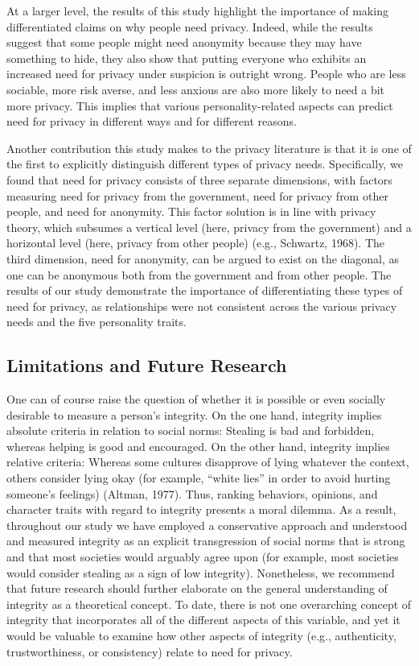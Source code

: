 \documentclass[man,floatsintext]{apa6}
\begin{document}
At a larger level, the results of this study highlight the importance of making differentiated claims on why people need privacy. Indeed, while the results suggest that some people might need anonymity because they may have something to hide, they also show that putting everyone who exhibits an increased need for privacy under suspicion is outright wrong. People who are less sociable, more risk averse, and less anxious are also more likely to need a bit more privacy. This implies that various personality-related aspects can predict need for privacy in different ways and for different reasons.

Another contribution this study makes to the privacy literature is that it is one of the first to explicitly distinguish different types of privacy needs. Specifically, we found that need for privacy consists of three separate dimensions, with factors measuring need for privacy from the government, need for privacy from other people, and need for anonymity. This factor solution is in line with privacy theory, which subsumes a vertical level (here, privacy from the government) and a horizontal level (here, privacy from other people) (e.g., Schwartz, 1968). The third dimension, need for anonymity, can be argued to exist on the diagonal, as one can be anonymous both from the government and from other people. The results of our study demonstrate the importance of differentiating these types of need for privacy, as relationships were not consistent across the various privacy needs and the five personality traits.

\hypertarget{limitations-and-future-research}{%
\subsection{Limitations and Future Research}\label{limitations-and-future-research}}

One can of course raise the question of whether it is possible or even socially desirable to measure a person's integrity. On the one hand, integrity implies absolute criteria in relation to social norms: Stealing is bad and forbidden, whereas helping is good and encouraged. On the other hand, integrity implies relative criteria: Whereas some cultures disapprove of lying whatever the context, others consider lying okay (for example, \enquote{white lies} in order to avoid hurting someone's feelings) (Altman, 1977). Thus, ranking behaviors, opinions, and character traits with regard to integrity presents a moral dilemma. As a result, throughout our study we have employed a conservative approach and understood and measured integrity as an explicit transgression of social norms that is strong and that most societies would arguably agree upon (for example, most societies would consider stealing as a sign of low integrity). Nonetheless, we recommend that future research should further elaborate on the general understanding of integrity as a theoretical concept. To date, there is not one overarching concept of integrity that incorporates all of the different aspects of this variable, and yet it would be valuable to examine how other aspects of integrity (e.g., authenticity, trustworthiness, or consistency) relate to need for privacy.
\end{document}

